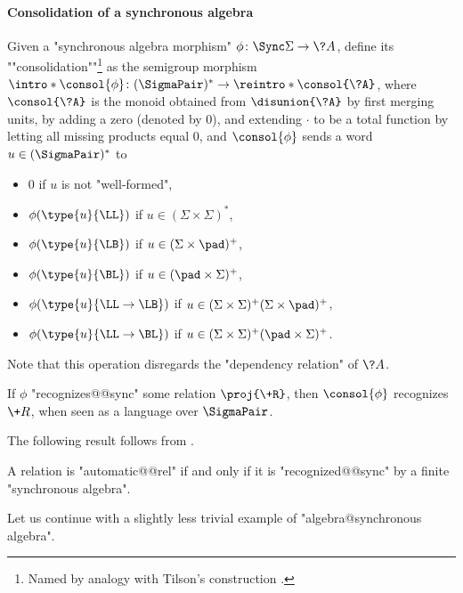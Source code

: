 \paragraph*{Consolidation of a synchronous algebra}
Given a "synchronous algebra morphism" $\phi\colon \Sync\Sigma \to \?A$,
define its \AP""consolidation""\footnote{Named by analogy with Tilson's construction \cite[\S 3, p.~102]{Tilson1987Categories}.} as the semigroup morphism
$\intro*\consol{\phi}\colon (\SigmaPair)^* \to \reintro*\consol{\?A}$, where
$\consol{\?A}$ is the monoid obtained from
$\disunion{\?A}$ by first merging units,
by adding a zero (denoted by $0$), and extending $\cdot$
to be a total function by letting all missing products equal $0$,
and $\consol{\phi}$ sends a word $u \in (\SigmaPair)^*$ to%
\vspace{-1.25em}
\begin{multicols}{2}%
	\begin{itemize}%
		\item $0$ if $u$ is not "well-formed",
		\item $\phi(\type{u}{\LL})$ if $u \in (\Sigma\times \Sigma)^*$,
		\item $\phi(\type{u}{\LB})$ if $u \in (\Sigma\times \pad)^+$,
		\item $\phi(\type{u}{\BL})$ if $u \in (\pad\times \Sigma)^+$,
		\item $\phi(\type{u}{\LL\to\LB})$ if $u \in (\Sigma\times \Sigma)^+(\Sigma\times \pad)^+$,
		\item $\phi(\type{u}{\LL\to\BL})$ if $u \in (\Sigma\times \Sigma)^+(\pad\times \Sigma)^+$.
	\end{itemize}
\end{multicols}
\vspace{-1.25em}
Note that this operation disregards the "dependency relation" of $\?A$.
\begin{fact}
	\AP\label{fact:consolidation}
	If $\phi$ "recognizes@@sync" some relation $\proj{\+R}$,
	then $\consol{\phi}$ recognizes $\+R$, when seen as
	a language over $\SigmaPair$.
\end{fact}

The following result follows from .
\begin{proposition}
	\AP\label{prop:synchronous-iff-finite}
	A relation is "automatic@@rel" if and only if it is "recognized@@sync"
	by a finite "synchronous algebra".
\end{proposition}

Let us continue with a slightly less trivial example of "algebra@synchronous algebra".

